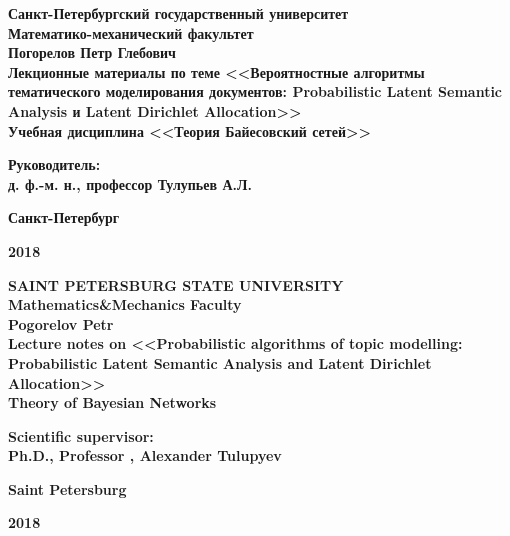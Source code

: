 \documentclass[aps,%
12pt,%
final,%
oneside,
onecolumn,%
musixtex, %
superscriptaddress,%
centertags]{article} %
\begin{document}
\begin{titlepage}
\begin{center}
\textbf{\large Санкт-Петербургский государственный университет} \\[0.8cm]
\textbf{\large Математико-механический факультет} \\[6.7cm]

\textbf{\LARGE Погорелов Петр Глебович}\\[1.0cm]
\textbf{\Large Лекционные материалы по теме <<Вероятностные алгоритмы тематического моделирования документов: Probabilistic Latent Semantic Analysis и Latent Dirichlet Allocation>>} \\[0.4cm]
\textbf{\Large Учебная дисциплина <<Теория Байесовский сетей>>} \\[5.7cm]

\begin{flushright} \large
\textbf{Руководитель:} \\
\textbf{д. ф.-м. н., профессор Тулупьев А.Л.}
\end{flushright}
\vfill

{\large \textbf{{Санкт-Петербург}}} \par
{\large \textbf{{2018}}}
\end{center}
\end{titlepage}

\begin{titlepage}
\begin{center}
\textbf{\Large SAINT PETERSBURG STATE UNIVERSITY} \\[0.6cm]
\textbf{\large Mathematics\&Mechanics Faculty} \\[6.7cm]

\textbf{\LARGE Pogorelov Petr}\\[1.0cm]
\textbf{\Large Lecture notes on <<Probabilistic algorithms of topic modelling: Probabilistic Latent Semantic Analysis and Latent Dirichlet Allocation>>} \\[0.4cm]
\textbf{\Large Theory of Bayesian Networks} \\[5.7cm]

\begin{flushright} \large
\textbf{Scientific supervisor:} \\
\textbf{Ph.D., Professor , Alexander Tulupyev}
\end{flushright}
\vfill

{\large \textbf{{Saint Petersburg}}} \par
{\large \textbf{{2018}}}
\end{center}
\end{titlepage}
\end{document}
